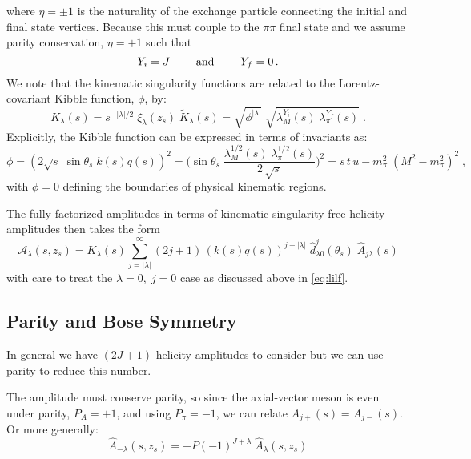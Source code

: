 where \(\eta = \pm1\) is the naturality of the exchange particle connecting the initial and final state vertices. Because this must couple to the \(\pi\pi\) final state and we assume parity conservation, \(\eta = +1\) such that
  \begin{equation}
    Y_i =  J \qquad \text{ and } \qquad  Y_f =  0 \, .
    \end{equation}
We note that the kinematic singularity functions are related to the Lorentz-covariant Kibble function, \(\phi\), by:
  \begin{equation}
    \label{eq:k-factor}
    K_\lambda(s) = s^{-|\lambda|/2} \; \xi_{\lambda}(z_s) \; \tilde{K}_{\lambda}(s) = \sqrt{\phi^{|\lambda|}} \; \sqrt{\lambda_M^{Y_i}(s) \; \lambda_\pi^{Y_f}(s)}\;  .
  \end{equation}
Explicitly, the Kibble function can be expressed in terms of invariants as:
  \begin{equation}
    \phi = (2\sqrt{s} \; \sin \theta_s \; k(s) q(s))^2 =  \bigg( \sin\theta_s \; \frac{\lambda^{1/2}_M(s) \; \lambda^{1/2}_\pi(s)}{2 \,\sqrt{s}} \bigg)^2 = s \, t\, u - m_\pi^2 \;(M^2 - m_\pi^2)^2 \; ,
  \end{equation}
with \(\phi = 0\) defining the boundaries of physical kinematic regions.

The fully factorized amplitudes in terms of kinematic-singularity-free helicity amplitudes then takes the form
  \begin{equation}
    \label{eq:helicity-final}
    \mathcal{A}_\lambda(s,z_s) =  K_{\lambda}(s)  \sum_{j= |\lambda|}^\infty (2j+1) \, (k(s)q(s))^{j- |\lambda|} \; \hat{d}^j_{\lambda0}(\theta_s)  \; \hat{A}_{j\lambda}(s)
  \end{equation}
with care to treat the \(\lambda =0, \;  j=0\) case as discussed above in \cref{eq:lilf}.
\subsection{Parity and Bose Symmetry} \label{sec:symmetry}
In general we have \((2J+1)\) helicity amplitudes to consider but we can use parity to reduce this number.

The amplitude must conserve parity, so since the axial-vector meson is even under parity, \( P_A = +1\), and using \(P_\pi = -1\), we can relate \(A_{j+}(s) = A_{j-}(s)\). Or more generally:
  \begin{equation}
    \label{parity-jpc}
    \hat{A}_{-\lambda}(s,z_s) = -P(-1)^{J+\lambda} \; \hat{A}_{\lambda}(s,z_s)
  \end{equation}


